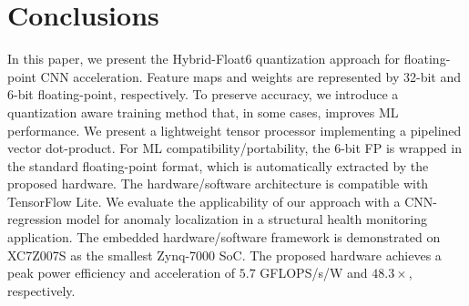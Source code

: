 \section{Conclusions}
\label{sec:conclusions}
In this paper, we present the Hybrid-Float6 quantization approach for floating-point CNN acceleration. Feature maps and weights are represented by 32-bit and 6-bit floating-point, respectively. To preserve accuracy, we introduce a quantization aware training method that, in some cases, improves ML performance. We present a lightweight tensor processor implementing a pipelined vector dot-product. For ML compatibility/portability, the 6-bit FP is wrapped in the standard floating-point format, which is automatically extracted by the proposed hardware. The hardware/software architecture is compatible with TensorFlow Lite. We evaluate the applicability of our approach with a CNN-regression model for anomaly localization in a structural health monitoring application. The embedded hardware/software framework is demonstrated on XC7Z007S as the smallest Zynq-7000 SoC. The proposed hardware achieves a peak power efficiency and acceleration of $5.7$ GFLOPS/s/W and $48.3\times$, respectively.